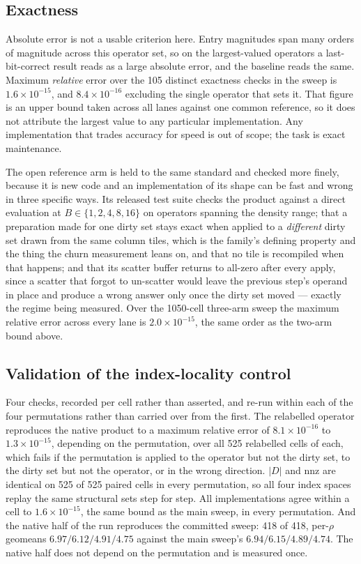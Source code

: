 \documentclass{article}
\begin{document}
\subsection{Exactness}

Absolute error is not a usable criterion here. Entry magnitudes span many orders
of magnitude across this operator set, so on the largest-valued operators a
last-bit-correct result reads as a large absolute error, and the baseline reads
the same. Maximum \emph{relative} error over the 105 distinct exactness checks in
the sweep is $1.6\times10^{-15}$, and $8.4\times10^{-16}$ excluding the single
operator that sets it. That figure is an upper bound taken across all lanes
against one common reference, so it does not attribute the largest value to any
particular implementation. Any
implementation that trades accuracy for speed is out of scope; the task is exact
maintenance.

The open reference arm is held to the same standard and checked more finely,
because it is new code and an implementation of its shape can be fast and wrong
in three specific ways. Its released test suite checks the product against a
direct evaluation at $B \in \{1,2,4,8,16\}$ on operators spanning the density
range; that a preparation made for one dirty set stays exact when applied to a
\emph{different} dirty set drawn from the same column tiles, which is the
family's defining property and the thing the churn measurement leans on, and that
no tile is recompiled when that happens; and that its scatter buffer returns to
all-zero after every apply, since a scatter that forgot to un-scatter would leave
the previous step's operand in place and produce a wrong answer only once the
dirty set moved --- exactly the regime being measured. Over the 1050-cell
three-arm sweep the maximum relative error across every lane is
$2.0\times10^{-15}$, the same order as the two-arm bound above.

\subsection{Validation of the index-locality control}

Four checks, recorded per cell rather than asserted, and re-run within each of
the four permutations rather than carried over from the first. The relabelled
operator reproduces the native product to a maximum relative error of
$8.1\times10^{-16}$ to $1.3\times10^{-15}$, depending on the permutation, over
all 525 relabelled cells of each, which fails if the
permutation is applied to the operator but not the dirty set, to the dirty set
but not the operator, or in the wrong direction. $|D|$ and $\mathrm{nnz}$ are
identical on 525 of 525 paired cells in every permutation, so all four index
spaces replay the same structural sets step for step. All implementations agree
within a cell to $1.6\times10^{-15}$, the same bound as the main sweep, in every
permutation. And the native half of
the run reproduces the committed sweep: 418 of 418, per-$\rho$ geomeans
$6.97/6.12/4.91/4.75$ against the main sweep's $6.94/6.15/4.89/4.74$. The native
half does not depend on the permutation and is measured once.
\end{document}

